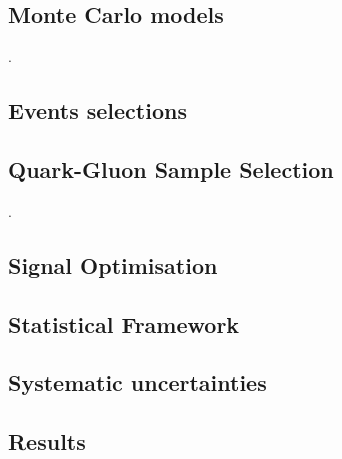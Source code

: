 \subsection{Monte Carlo models}
\label{sec:benchmark_signals}.  %

\clearpage

\subsection{Events selections}
\label{sec:event_selection}

\clearpage


\subsection{Quark-Gluon Sample Selection}
\label{sec:QGselection}.  %

\clearpage

\subsection{Signal Optimisation}
\label{sec:Optimisation} %

\clearpage

\subsection{Statistical Framework}

\clearpage


\subsection{Systematic uncertainties}

\clearpage


\subsection{Results}

\clearpage




